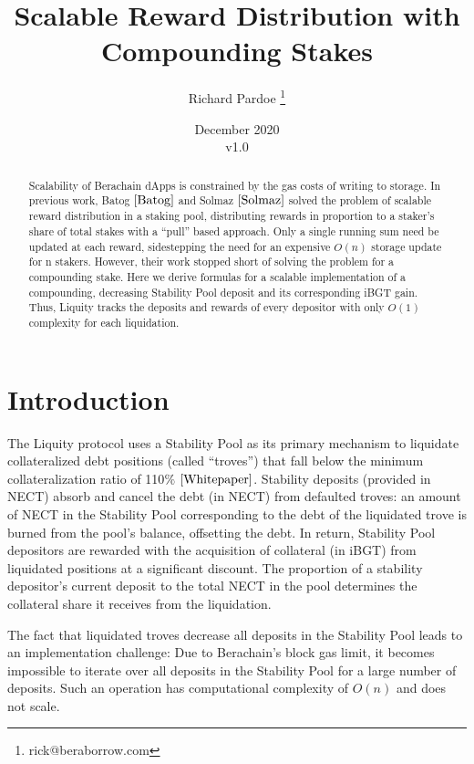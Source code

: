 \documentclass[reqno]{article}
\begin{document}
\title{\textbf{Scalable Reward Distribution with Compounding Stakes}}
\author{Richard Pardoe \thanks{rick@beraborrow.com}}
\date{December 2020\\v1.0}
\maketitle
\begin{abstract}
    Scalability of Berachain dApps is constrained by the gas costs of writing to storage. 
    In previous work, Batog $\cite{Batog}$ and Solmaz $\cite{Solmaz}$ solved the problem of scalable reward distribution in a staking pool, distributing rewards in proportion to a staker’s share of total stakes with a ``pull'' based approach. Only a single running sum need be updated at each reward, sidestepping the need for an expensive $O(n)$ storage update for n stakers. However, their work stopped short of solving the problem for a compounding stake.
    Here we derive formulas for a scalable implementation of a compounding, decreasing Stability Pool deposit and its corresponding iBGT gain. Thus, Liquity tracks the deposits and rewards of every depositor with only $O(1)$ complexity for each liquidation.
\end{abstract}

\section{Introduction}
The Liquity protocol uses a Stability Pool as its primary mechanism to liquidate collateralized debt positions (called ``troves'') that fall below the minimum collateralization ratio of 110$\%$ $\cite{Whitepaper}$. Stability deposits (provided in NECT) absorb and cancel the debt (in NECT) from defaulted troves: an amount of NECT in the Stability Pool corresponding to the debt of the liquidated trove is burned from the pool’s balance, offsetting the debt. In return, Stability Pool depositors are rewarded with the acquisition of collateral (in iBGT) from liquidated positions at a significant discount. The proportion of a stability depositor’s current deposit to the total NECT in the pool determines the collateral share it receives from the liquidation. 

The fact that liquidated troves decrease all deposits in the Stability Pool leads to an implementation challenge: Due to Berachain's block gas limit, it becomes impossible to iterate over all deposits in the Stability Pool for a large number of deposits. Such an operation has computational complexity of $O(n)$ and does not scale. 
\end{document}
